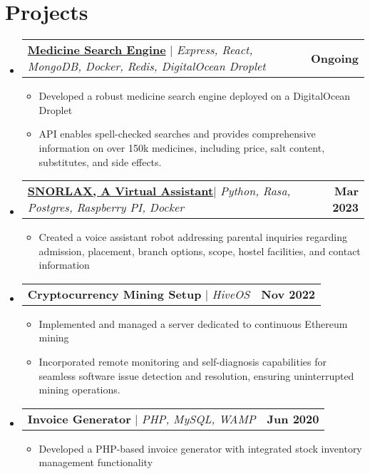 \documentclass[letterpaper,11pt]{article}
\makeatletter
\newcommand{\resumeItem}[1]{
  \item\small{
    {#1 \vspace{-2pt}}
  }
}
\newcommand{\resumeProjectHeading}[2]{
    \item
    \begin{tabular*}{1.001\textwidth}{l@{\extracolsep{\fill}}r}
      \small#1 & \textbf{\small #2}\\
    \end{tabular*}\vspace{-7pt}
}
\newcommand{\resumeSubHeadingListStart}{\begin{itemize}[leftmargin=0.0in, label={}]}
\newcommand{\resumeSubHeadingListEnd}{\end{itemize}}
\newcommand{\resumeItemListStart}{\begin{itemize}}
\newcommand{\resumeItemListEnd}{\end{itemize}\vspace{-5pt}}
\makeatother
\begin{document}
\section{Projects}
    \vspace{-5pt}
    \resumeSubHeadingListStart
     \resumeProjectHeading
         {\textcolor{black}
         {\textbf{\href{}{Medicine Search Engine}}} $|$ \emph{Express, React, MongoDB, Docker, Redis, DigitalOcean Droplet}}{Ongoing}
          \resumeItemListStart
            \resumeItem{
       Developed a robust medicine search engine deployed on a DigitalOcean Droplet}
            \resumeItem{API enables spell-checked searches and provides comprehensive information on over 150k medicines, including price, salt content, substitutes, and side effects.}
          \resumeItemListEnd
          \vspace{-13pt}
          \resumeProjectHeading
          {\textcolor{black}{\textbf{\href{}{SNORLAX, A Virtual Assistant}}}$|$ \emph{Python, Rasa, Postgres, Raspberry PI, Docker}}{Mar 2023}
          \resumeItemListStart

          \resumeItem{Created a voice assistant robot addressing parental inquiries regarding admission, placement, branch options, scope, hostel facilities, and contact information}
         \resumeItemListEnd 
        \vspace{-15pt}
         \resumeProjectHeading
          {\textbf{Cryptocurrency Mining Setup} $|$ \emph{HiveOS}}{Nov 2022}
          \resumeItemListStart
            \resumeItem{Implemented and managed a server dedicated to continuous Ethereum mining }   
            \resumeItem{Incorporated remote monitoring and self-diagnosis capabilities for seamless software issue detection and resolution, ensuring uninterrupted mining operations.} 
          \resumeItemListEnd
          \vspace{-13pt}
          \resumeProjectHeading
          {\textbf{Invoice Generator} $|$ \emph{PHP, MySQL, WAMP}}{Jun 2020}
          \resumeItemListStart
            \resumeItem{Developed a PHP-based invoice generator with integrated stock inventory management functionality}   
              
          \resumeItemListEnd


    \resumeSubHeadingListEnd
\vspace{-9pt}
\end{document}
